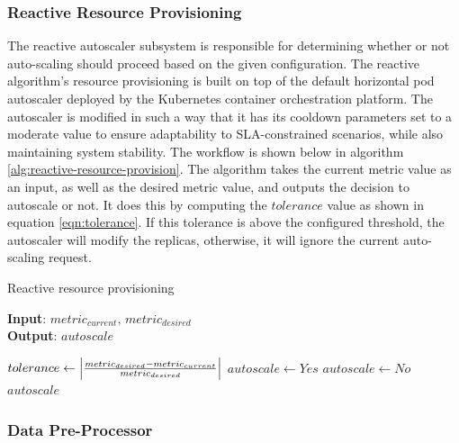 \subsubsection{Reactive Resource Provisioning}

The reactive autoscaler subsystem is responsible for determining whether or not auto-scaling should proceed based on the given configuration. The reactive algorithm's resource provisioning is built on top of the default horizontal pod autoscaler deployed by the Kubernetes container orchestration platform. The autoscaler is modified in such a way that it has its cooldown parameters set to a moderate value to ensure adaptability to SLA-constrained scenarios, while also maintaining system stability. The workflow is shown below in algorithm \ref{alg:reactive-resource-provision}. The algorithm takes the current metric value as an input, as well as the desired metric value, and outputs the decision to autoscale or not. It does this by computing the $tolerance$ value as shown in equation \ref{eqn:tolerance}. If this tolerance is above the configured threshold, the autoscaler will modify the replicas, otherwise, it will ignore the current auto-scaling request.\par

\begin{algorithm}
    \caption{Reactive resource provisioning}
    \label{alg:reactive-resource-provision}
    \textbf{Input}: $metric_{current},\, metric_{desired}$\\
    \textbf{Output}: $autoscale$
    \begin{algorithmic}
        \State $tolerance \gets \abs{ \frac{metric_{desired} - metric_{current}}{metric_{desired}} }$
            \State $autoscale \gets Yes$
        \Else
            \State $autoscale \gets No$
        \EndIf
        \State \Return $autoscale$
    \end{algorithmic}
\end{algorithm}

\subsubsection{Data Pre-Processor}
\label{subsubsec:ch3-data-pre-process}

